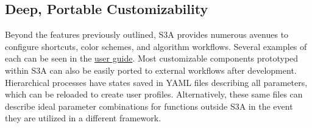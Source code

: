 \makeCropExportsFig

\subsection{Deep, Portable Customizability}
Beyond the features previously outlined, S3A provides numerous avenues to configure shortcuts, color schemes, and algorithm workflows. Several examples of each can be seen in the \href{https://gitlab.com/s3a/s3a/-/wikis/docs/user's-guide}{user guide}. Most customizable components prototyped within S3A can also be easily ported to external workflows after development. Hierarchical processes have states saved in YAML files describing all parameters, which can be reloaded to create user profiles. Alternatively, these same files can describe ideal parameter combinations for functions outside S3A in the event they are utilized in a different framework.
